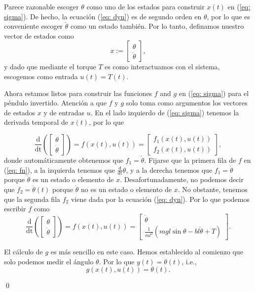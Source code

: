 \begin{example}
Parece razonable escoger $\theta$ como uno de los estados para construir $x(t)$ en (\ref{eq: sigma}). De hecho, la ecuación (\ref{eq: dyn}) es de segundo orden en $\theta$, por lo que es conveniente escoger $\dot\theta$ como un estado también. Por lo tanto, definamos nuestro vector de estados como
\begin{equation}
x := \begin{bmatrix}\theta \\ \dot\theta \end{bmatrix},
\end{equation}
y dado que mediante el torque $T$ es como interactuamos con el sistema, escogemos como entrada $u(t) = T(t)$.

Ahora estamos listos para construir las funciones $f$ and $g$ en (\ref{eq: sigma}) para el péndulo invertido. Atención a que $f$ y $g$ solo toma como argumentos los vectores de estados $x$ y de entradas $u$. En el lado izquierdo de (\ref{eq: sigma}) tenemos la derivada temporal de $x(t)$, por lo que

\begin{equation}
	\frac{\mathrm{d}}{\mathrm{dt}}\left(\begin{bmatrix}\theta \\ \dot\theta \end{bmatrix}\right) = f(x(t), u(t)) = \begin{bmatrix}f_1(x(t), u(t)) \\ f_2(x(t), u(t))\end{bmatrix}, \label{eq: fn}
\end{equation}
donde automáticamente obtenemos que $f_1 = \dot\theta$. Fijarse que la primera fila de $f$ en (\ref{eq: fn}), a la izquierda tenemos que $\frac{\mathrm{d}}{\mathrm{dt}}\theta$, y a la derecha tenemos que $f_1 = \dot\theta$ porque $\dot\theta$ es un estado o elemento de $x$. Desafortunadamente, no podemos decir que $f_2 = \ddot\theta(t)$ porque $ \ddot\theta$ no es un estado o elemento de $x$. No obstante, tenemos que la segunda fila $f_2$ viene dada por la ecuación (\ref{eq: dyn}). Por lo que podemos escribir $f$ como
\begin{equation}
	\frac{\mathrm{d}}{\mathrm{dt}}\left(\begin{bmatrix}\theta \\ \dot\theta \end{bmatrix}\right) =  f(x(t), u(t)) = \begin{bmatrix} \dot\theta \\ \frac{1}{ml^2}\left(mgl\sin{\theta}-bl\dot\theta + T\right) \end{bmatrix}. \label{eq: f}
\end{equation}

El cálculo de $g$ es más sencillo en este caso. Hemos establecido al comienzo que solo podemos medir el ángulo $\theta$. Por lo que $y(t) = \theta(t)$, i.e.,
\begin{equation}
g(x(t),u(t)) =  \theta(t).
	\label{eq: g}
\end{equation}

\qed 
\end{example}

